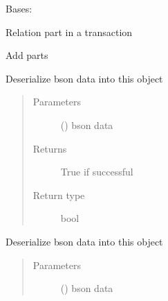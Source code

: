 \documentclass[letterpaper,10pt,english]{sphinxmanual}
\begin{document}
\begin{fulllineitems}
\label{\detokenize{bbc1.core.bbclib:bbc1.core.bbclib.BBcRelation}}
Bases: 

Relation part in a transaction

\begin{fulllineitems}
\label{\detokenize{bbc1.core.bbclib:bbc1.core.bbclib.BBcRelation.add}}
Add parts

\end{fulllineitems}


\begin{fulllineitems}
\label{\detokenize{bbc1.core.bbclib:bbc1.core.bbclib.BBcRelation.deserialize}}
Deserialize bson data into this object
\begin{quote}\begin{description}
\item[{Parameters}] \leavevmode
{} () \textendash{} bson data

\item[{Returns}] \leavevmode
True if successful

\item[{Return type}] \leavevmode
bool

\end{description}\end{quote}

\end{fulllineitems}


\begin{fulllineitems}
\label{\detokenize{bbc1.core.bbclib:bbc1.core.bbclib.BBcRelation.deserialize_bson}}
Deserialize bson data into this object
\begin{quote}\begin{description}
\item[{Parameters}] \leavevmode
{} () \textendash{} bson data


\end{description}
\end{quote}
\end{fulllineitems}
\end{fulllineitems}
\end{document}

